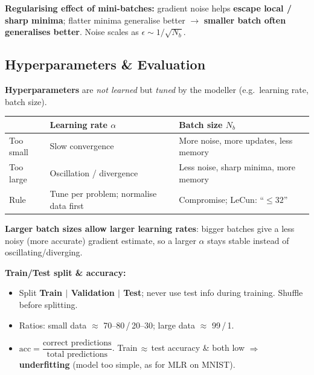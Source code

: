 \documentclass[10pt,a4paper]{article}
\begin{document}
	\begin{importantbox}
		\textbf{Regularising effect of mini-batches:} gradient noise helps \textbf{escape local / sharp minima}; flatter minima generalise better $\rightarrow$ \textbf{smaller batch often generalises better}. Noise scales as $\epsilon\sim 1/\sqrt{N_b}$.
	\end{importantbox}

	\subsection{Hyperparameters \& Evaluation}

	\begin{definitionbox}
		\textbf{Hyperparameters} are \emph{not learned} but \emph{tuned} by the modeller (e.g.\ learning rate, batch size).
	\end{definitionbox}

	\begin{center}
		\begin{tabular}{p{3cm} p{6cm} p{6cm}}
			\toprule
			& \textbf{Learning rate $\alpha$} & \textbf{Batch size $N_b$} \\
			\midrule
			Too small & Slow convergence & More noise, more updates, less memory \\
			Too large & Oscillation / divergence & Less noise, sharp minima, more memory \\
			Rule      & Tune per problem; normalise data first & Compromise; LeCun: ``$\le 32$'' \\
			\bottomrule
		\end{tabular}
	\end{center}

	\begin{importantbox}
		\textbf{Larger batch sizes allow larger learning rates}: bigger batches give a less noisy (more accurate) gradient estimate, so a larger $\alpha$ stays stable instead of oscillating/diverging.
	\end{importantbox}

	\textbf{Train/Test split \& accuracy:}
	\begin{itemize}[leftmargin=*]
		\item Split \textbf{Train $\mid$ Validation $\mid$ Test}; never use test info during training. Shuffle before splitting.
		\item Ratios: small data $\approx$ 70--80\,/\,20--30; large data $\approx$ 99\,/\,1.
		\item $\mathrm{acc}=\dfrac{\text{correct predictions}}{\text{total predictions}}$. Train\,$\approx$\,test accuracy \& both low $\Rightarrow$ \textbf{underfitting} (model too simple, as for MLR on MNIST).
	\end{itemize}
\end{document}
